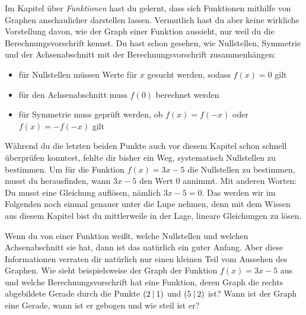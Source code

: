 \documentclass[../../main.tex]{subfiles}
\begin{document}
Im Kapitel über \emph{Funktionen} hast du gelernt, dass sich Funktionen mithilfe von Graphen anschaulicher darstellen lassen. Vermutlich hast du aber keine wirkliche Vorstellung davon, wie der Graph einer Funktion aussieht, nur weil du die Berechnungsvorschrift kennst. Du hast schon gesehen, wie Nullstellen, Symmetrie und der Achsenabschnitt mit der Berechnungsvorschrift zusammenhängen:
\begin{itemize}
    \item für Nullstellen müssen Werte für $x$ gesucht werden, sodass $f(x)=0$ gilt
    \item für den Achsenabschnitt muss $f(0)$ berechnet werden
    \item für Symmetrie muss geprüft werden, ob $f(x)=f(-x)$ oder $f(x)=-f(-x)$ gilt
\end{itemize}
Während du die letzten beiden Punkte auch vor diesem Kapitel schon schnell überprüfen konntest, fehlte dir bisher ein Weg, systematisch Nullstellen zu bestimmen. Um für die Funktion $f(x)=3x-5$ die Nullstellen zu bestimmen, musst du herausfinden, wann $3x-5$ den Wert $0$ annimmt. Mit anderen Worten: Du musst eine Gleichung auflösen, nämlich $3x-5=0$. Das werden wir im Folgenden noch einmal genauer unter die Lupe nehmen, denn mit dem Wissen aus diesem Kapitel bist du mittlerweile in der Lage, lineare Gleichungen zu lösen.


Wenn du von einer Funktion weißt, welche Nullstellen und welchen Achsenabschnitt sie hat, dann ist das natürlich ein guter Anfang. Aber diese Informationen verraten dir natürlich nur einen kleinen Teil vom Aussehen des Graphen. 
Wie sieht beispielsweise der Graph der Funktion $f(x)=3x-5$ aus und welche Berechnungsvorschrift hat eine Funktion, deren Graph die rechts abgebildete Gerade durch die Punkte $\left(2 \:\middle|\: 1\right)$ und $\left(5 \:\middle|\: 2\right)$ ist? Wann ist der Graph eine Gerade, wann ist er gebogen und wie steil ist er?
\end{document}

